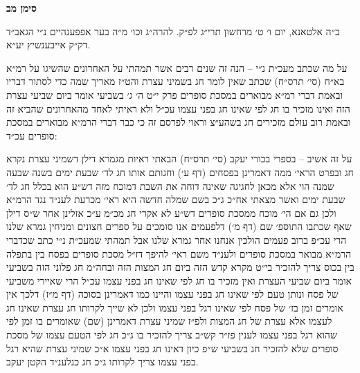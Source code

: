 \documentclass[12pt, openany]{book}
\newcommand{\chapname}{}
\newcommand{\newchap}[1]{
	\addcontentsline{toc}{chapter}{#1}
	\renewcommand{\chapname}{#1}
		\begin{center}
			\textbf{%
\fontsize{16pt}{16pt}\selectfont
				#1}
		\end{center}
}
\begin{document}
\newchap{סימן מב}
\begin{multicols}{2}
ב״ה אלטאנא, יום ו׳ ט׳ מרחשון תרי״ג לפ״ק. להרה״ג וכו׳ מ״ה בער אפפענהיים נ״י הגאב״ד דק״ק אייבענשיץ יע״א.\\\vspace{0pt}

על מה שכתב מעכ״ת נ״י – הנה זה שנים רבים אשר תמהתי על האחרונים שהשיגו על רמ״א בא״ח (סי׳ תרס״ח) שכתב שאין לומר חג בשמיני עצרת והט״ז מאריך שמה כדי לסתור דבריו ובאמת דברי רמ״א מבוארים במסכת סופרים פרק י״ט ה׳ ג׳ בשביעי אומר ביום שביעי עצרת הזה ואינו מזכיר בו חג לפי שאינו חג בפני עצמו עכ״ל ולא ראיתי לאחד מהאחרונים שהביא זה ובאמת רוב עולם מזכירים חג בשהע״צ וראוי לפרסם זה כי כבר דברי הרמ״א מבוארים במסכת סופרים עכ״ד:\\\vspace{0pt}

על זה אשיב – בספרי בכורי יעקב (סי׳ תרס״ח) הבאתי ראיות מגמרא דילן דשמיני עצרת נקרא חג ובפרט הראי׳ ממה דאמרינן בפסחים (דף ע׳) וחגותם אותו חג לד׳ שבעת ימים בשנה שבעה שמנה הוי אלא מכאן לחגיגה שאינה דוחה את השבת דמוכח מזה דש״ע הוא בכלל חג לד׳ שבעת ימים ואשר מצאתי אח״כ ג״כ בשם שמלה חדשה היא ראי׳ מכרעת לענ״ד נגד הרמ״א ולכן גם אם הי׳ מוכח ממסכת סופרים דש״ע לא אקרי חג מכ״מ ע״כ אזלינן אחר ש״ס דילן שאף שכתבו התוספ׳ שם (דף מ׳) דלפעמים אנו סומכים על ספרים חצונים ומניחין גמרא שלנו הרי עכ״פ ברוב פעמים הולכין אנחנו אחר גמרא שלנו אבל תמהתי שמעכ״ת נ״י כתב שכדברי הרמ״א מבואר במסכת סופרים ולענ״ד משם ראי׳ להיפך דז״ל מסכת סופרים בפסח בין בתפלה בין בכוס צריך להזכיר בי״ט מקרא קדש הזה ביום חג המצות הזה ובחה״מ חג פלוני הזה בשביעי אומר ביום שביעי העצרת ואין מזכיר בו חג לפי שאינו חג בפני עצמו עכ״ל הרי שאיירי משביעי של פסח ונותן טעם לפי שאינו חג בפני עצמו והיינו כמו דאמרינן בסוכה (דף מ״ז) דלכך אין אומרים זמן בז׳ של פסח לפי שאינו רגל בפני עצמו ולכן לא שייך לקרותו חג עצרת שאינו חג לעצמו אלא עצרת של חג המצות ולפ״ז שמיני עצרת דאמרינן (שם) שאומרים בו זמן לפי שהוא רגל בפני עצמו לענין פז״ר קש״ב צריך להזכיר בו ג״כ חג לפי הטעם עצמו של מסכת סופרים שלא להזכיר חג בשביעי ש״פ כיון דאינו חג בפני עצמו א״כ שמיני עצרת שהיא רגל בפני עצמו צריך לקרותו ג״כ חג כנלענ״ד הקטן יעקב.\\\vspace{0pt}

\end{multicols}\newpage
\end{document}
